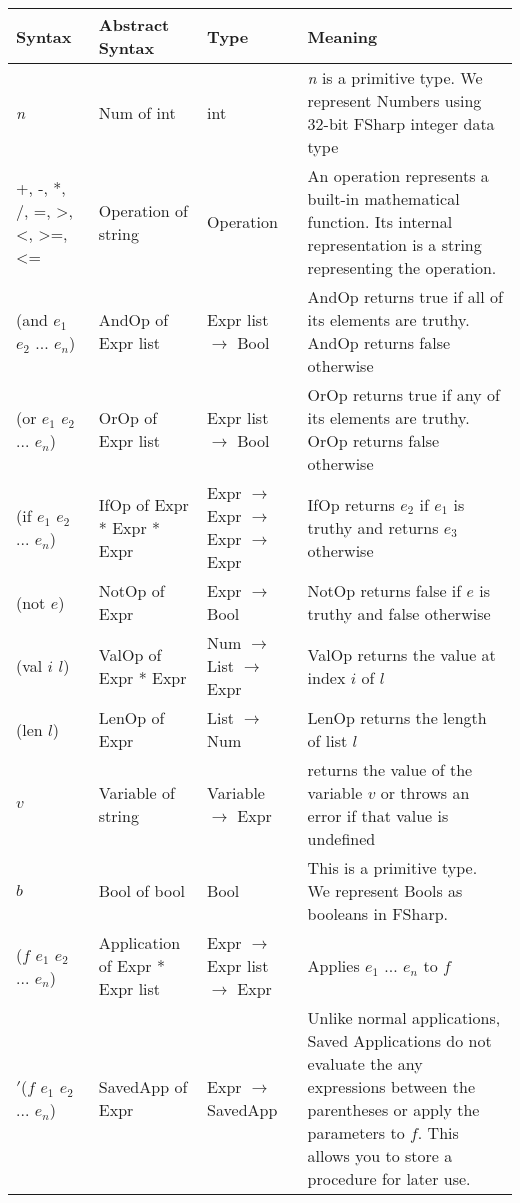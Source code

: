 \documentclass{article}
\begin{document}
\begin{longtable}{|p{}|p{}|p{}|p{}|}
\hline
\textbf{Syntax} & \textbf{Abstract Syntax} & \textbf{Type} & \textbf{Meaning} \\
\hline\hline
\textit{n} & Num of int & int  & \textit{n} is a primitive type. We represent Numbers using 32-bit FSharp integer data type \\
\hline
+, -, *, /, =, >, <, >=, <= & Operation of string & Operation  & An operation represents a built-in mathematical function. Its internal representation is a string representing the operation. \\
\hline
(and $e_{1}$ $e_{2}$ ... $e_{n}$) & AndOp of Expr list & Expr list $\rightarrow$ Bool  & AndOp returns true if all of its elements are truthy. AndOp returns false otherwise \\
\hline
(or $e_{1}$ $e_{2}$ ... $e_{n}$) & OrOp of Expr list & Expr list $\rightarrow$ Bool  & OrOp returns true if any of its elements are truthy. OrOp returns false otherwise \\
\hline
(if $e_{1}$ $e_{2}$ ... $e_{n}$) & IfOp of Expr * Expr * Expr & Expr $\rightarrow$ Expr $\rightarrow$ Expr $\rightarrow$ Expr & IfOp returns $e_{2}$ if $e_{1}$ is truthy and returns $e_{3}$ otherwise \\
\hline
(not $e$) & NotOp of Expr & Expr $\rightarrow$ Bool & NotOp returns false if $e$ is truthy and false otherwise \\
\hline
(val $i$ $l$) & ValOp of Expr * Expr & Num $\rightarrow$ List $\rightarrow$ Expr & ValOp returns the value at index $i$ of $l$ \\
\hline
(len $l$) & LenOp of Expr & List $\rightarrow$ Num & LenOp returns the length of list $l$ \\
\hline
$v$ & Variable of string & Variable $\rightarrow$ Expr &  returns the value of the variable $v$ or throws an error if that value is undefined \\
\hline
$b$ & Bool of bool & Bool & This is a primitive type. We represent Bools as booleans in FSharp. \\
\hline
($f$ $e_{1}$ $e_{2}$ ... $e_{n}$) & Application of Expr * Expr list & Expr $\rightarrow$ Expr list $\rightarrow$ Expr & Applies $e_{1}$ ... $e_{n}$ to $f$ \\
\hline
$'$($f$ $e_{1}$ $e_{2}$ ... $e_{n}$) & SavedApp of Expr & Expr  $\rightarrow$ SavedApp & Unlike normal applications, Saved Applications do not evaluate the any expressions between the parentheses or apply the parameters to $f$. This allows you to store a procedure for later use. \\

\end{longtable}
\end{document}
